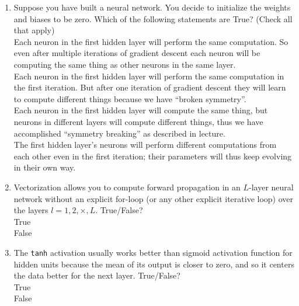 \begin{enumerate}
        \item Suppose you have built a neural network. You decide to initialize the weights and biases to be zero. Which of the following statements are True? (Check all that apply)\\
        \hspace{1cm}\checkmark Each neuron in the first hidden layer will perform the same computation. So even after multiple iterations of gradient descent each neuron will be computing the same thing as other neurons in the same layer.\\
        \hspace{1cm}\choice{} Each neuron in the first hidden layer will perform the same computation in the first iteration. But after one iteration of gradient descent they will learn to compute different things because we have ``broken symmetry''. \\ 
        \hspace{1cm}\choice{} Each neuron in the first hidden layer will compute the same thing, but neurons in different layers will compute different things, thus we have accomplished ``symmetry breaking'' as described in lecture. \\ 
        \hspace{1cm}\choice{} The first hidden layer's neurons will perform different computations from each other even in the first iteration; their parameters will thus keep evolving in their own way.\\
        \solution{}
    \item Vectorization allows you to compute forward propagation in an $L$-layer neural network without an explicit for-loop (or any other explicit iterative loop) over the layers $l=1, 2, \times, L$. True/False? \\ 
        \hspace{1cm}\choice{} True \\ 
        \hspace{1cm}\checkmark False\\
        \solution{}
    \item  The {\tt tanh} activation usually works better than sigmoid activation function for hidden units because the mean of its output is closer to zero, and so it centers the data better for the next layer.  True/False? \\ 
        \hspace{1cm}\checkmark True \\ 
        \hspace{1cm}\choice{} False \\ 
        \solution{}


\end{enumerate}
